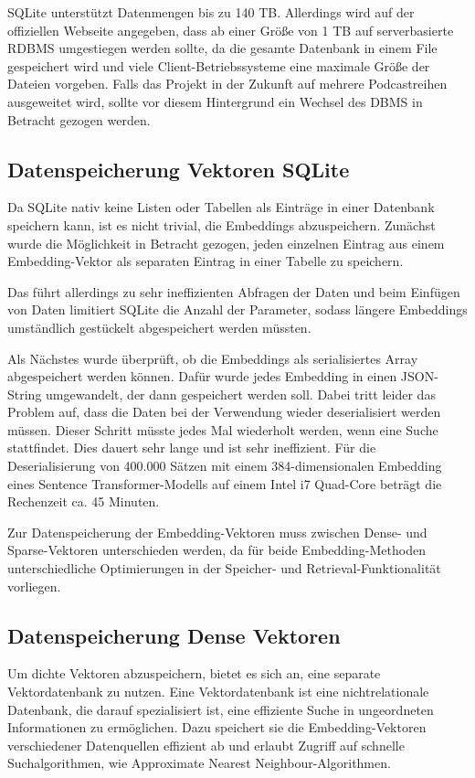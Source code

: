 SQLite unterstützt Datenmengen bis zu 140 TB.
Allerdings wird auf der offiziellen Webseite angegeben, dass ab einer Größe von 1 TB auf serverbasierte RDBMS umgestiegen werden sollte, da die gesamte Datenbank in einem File gespeichert wird und viele Client-Betriebssysteme eine maximale Größe der Dateien vorgeben.
Falls das Projekt in der Zukunft auf mehrere Podcastreihen ausgeweitet wird, sollte vor diesem Hintergrund ein Wechsel des DBMS in Betracht gezogen werden.

\subsection{Datenspeicherung Vektoren SQLite}

Da SQLite nativ keine Listen oder Tabellen als Einträge in einer Datenbank speichern kann, ist es nicht trivial, die Embeddings abzuspeichern.
Zunächst wurde die Möglichkeit in Betracht gezogen, jeden einzelnen Eintrag aus einem Embedding-Vektor als separaten Eintrag in einer Tabelle zu speichern.

Das führt allerdings zu sehr ineffizienten Abfragen der Daten und beim Einfügen von Daten limitiert SQLite die Anzahl der Parameter, sodass längere Embeddings umständlich gestückelt abgespeichert werden müssten.

Als Nächstes wurde überprüft, ob die Embeddings als serialisiertes Array abgespeichert werden können.
Dafür wurde jedes Embedding in einen JSON-String umgewandelt, der dann gespeichert werden soll.
Dabei tritt leider das Problem auf, dass die Daten bei der Verwendung wieder deserialisiert werden müssen.
Dieser Schritt müsste jedes Mal wiederholt werden, wenn eine Suche stattfindet.
Dies dauert sehr lange und ist sehr ineffizient.
Für die Deserialisierung von 400.000 Sätzen mit einem 384-dimensionalen Embedding eines Sentence Transformer-Modells auf einem Intel i7 Quad-Core beträgt die Rechenzeit ca. 45 Minuten.

Zur Datenspeicherung der Embedding-Vektoren muss zwischen Dense- und Sparse-Vektoren unterschieden werden, da für beide Embedding-Methoden unterschiedliche Optimierungen in der Speicher- und Retrieval-Funktionalität vorliegen.

\subsection{Datenspeicherung Dense Vektoren}

Um dichte Vektoren abzuspeichern, bietet es sich an, eine separate Vektordatenbank zu nutzen.
Eine Vektordatenbank ist eine nichtrelationale Datenbank, die darauf spezialisiert ist, eine effiziente Suche in ungeordneten Informationen zu ermöglichen.
Dazu speichert sie die Embedding-Vektoren verschiedener Datenquellen effizient ab und erlaubt Zugriff auf schnelle Suchalgorithmen, wie Approximate Nearest Neighbour-Algorithmen.

